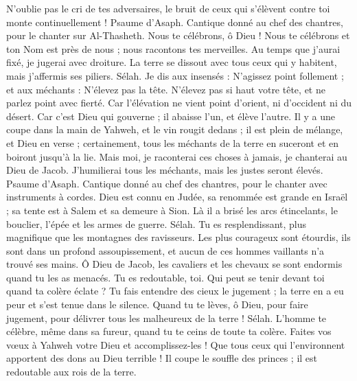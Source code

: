 \begin{multicols}{2}
N'oublie pas le cri de tes adversaires, le bruit de ceux qui s'élèvent contre toi monte continuellement !
\VerseOne{}Psaume d'Asaph. Cantique donné au chef des chantres, pour le chanter sur Al-Thasheth.
Nous te célébrons, ô Dieu ! Nous te célébrons et ton Nom est près de nous ; nous racontons tes merveilles.
Au temps que j'aurai fixé, je jugerai avec droiture.
La terre se dissout avec tous ceux qui y habitent, mais j'affermis ses piliers. Sélah.
Je dis aux insensés : N'agissez point follement ; et aux méchants : N'élevez pas la tête.
N'élevez pas si haut votre tête, et ne parlez point avec fierté.
Car l'élévation ne vient point d'orient, ni d'occident ni du désert.
Car c'est Dieu qui gouverne ; il abaisse l'un, et élève l'autre.
Il y a une coupe dans la main de Yahweh, et le vin rougit dedans ; il est plein de mélange, et Dieu en verse ; certainement, tous les méchants de la terre en suceront et en boiront jusqu'à la lie.
Mais moi, je raconterai ces choses à jamais, je chanterai au Dieu de Jacob.
J'humilierai tous les méchants, mais les justes seront élevés.
\VerseOne{}Psaume d'Asaph. Cantique donné au chef des chantres, pour le chanter avec instruments à cordes.
Dieu est connu en Judée, sa renommée est grande en Israël ;
sa tente est à Salem et sa demeure à Sion.
Là il a brisé les arcs étincelants, le bouclier, l'épée et les armes de guerre. Sélah.
Tu es resplendissant, plus magnifique que les montagnes des ravisseurs.
Les plus courageux sont étourdis, ils sont dans un profond assoupissement, et aucun de ces hommes vaillants n'a trouvé ses mains.
Ô Dieu de Jacob, les cavaliers et les chevaux se sont endormis quand tu les as menacés.
Tu es redoutable, toi. Qui peut se tenir devant toi quand ta colère éclate ?
Tu fais entendre des cieux le jugement ; la terre en a eu peur et s'est tenue dans le silence.
Quand tu te lèves, ô Dieu, pour faire jugement, pour délivrer tous les malheureux de la terre ! Sélah.
L'homme te célèbre, même dans sa fureur, quand tu te ceins de toute ta colère.
Faites vos vœux à Yahweh votre Dieu et accomplissez-les ! Que tous ceux qui l'environnent apportent des dons au Dieu terrible !
Il coupe le souffle des princes ; il est redoutable aux rois de la terre.

\end{multicols}
